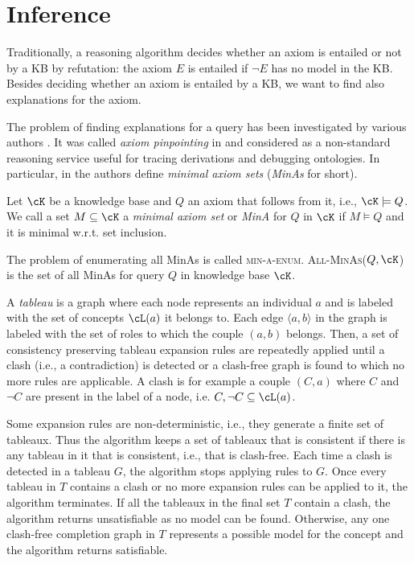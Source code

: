 \section{Inference}
\label{inf}

Traditionally, a reasoning algorithm decides  whether an axiom is entailed or not by a KB by refutation: the  axiom $E$ is entailed if $\neg E$ has no model
in the KB.
Besides deciding whether an axiom is entailed by a KB, we want to find also explanations for the axiom.

The problem of finding  explanations for a query
has been investigated by various authors \cite{DBLP:conf/ijcai/SchlobachC03,DBLP:journals/ws/KalyanpurPSH05,DBLP:conf/semweb/KalyanpurPHS07,Kalyanpurphd,extended_tracing}.
 It was called  \emph{axiom pinpointing} in 
\cite{DBLP:conf/ijcai/SchlobachC03}  and considered as a non-standard reasoning service useful for tracing derivations and debugging ontologies. 
In particular, in \cite{DBLP:conf/ijcai/SchlobachC03} the authors define \emph{minimal axiom sets}  (\emph{MinAs} for short).
\begin{definition}[MinA]
 Let $\cK$ be a knowledge base and $Q$ an
axiom that follows from it, i.e., 
$\cK \models Q$. We call a set 
$M\subseteq \cK$ a
\emph{minimal axiom set} or \emph{MinA} for $Q$ in $\cK$ if 
$M \models Q$ and it is minimal
w.r.t. set inclusion.
\end{definition}  
\noindent The problem of enumerating all MinAs is called \textsc{min-a-enum}.
\textsc{All-MinAs($Q,\cK$)} is the set of all MinAs for query $Q$ in knowledge base $\cK$.

A \emph{tableau} is a graph where each node represents an
individual $a$ and is labeled with the set of concepts $\cL(a)$ it belongs to. Each
edge $\langle a, b\rangle$ in the graph is labeled with the set of roles to which the couple
$(a, b)$ belongs. Then, a set of  consistency preserving tableau
expansion rules are repeatedly applied until a clash (i.e., a contradiction) is detected or a clash-free
graph is found to which no more rules are applicable. A clash is for example a
couple $(C, a)$ where $C$ and $\neg C$ are present in the label of a node, i.e. ${C, \neg C} \subseteq \cL(a)$.

Some expansion rules are non-deterministic, i.e., they generate
a finite set of tableaux. Thus the algorithm keeps a set of tableaux that is
consistent if there is any tableau in it that is consistent, i.e., that is clash-free.
Each time a clash is detected in a tableau $G$, the algorithm stops applying rules
to $G$. Once every tableau in $T$ contains a clash or no more expansion rules
can be applied to it, the algorithm terminates. If all the tableaux in the final
set $T$ contain a clash, the algorithm returns unsatisfiable as no model can be
found. Otherwise, any one clash-free completion graph in $T$ represents a possible
model for the concept and the algorithm returns satisfiable.

